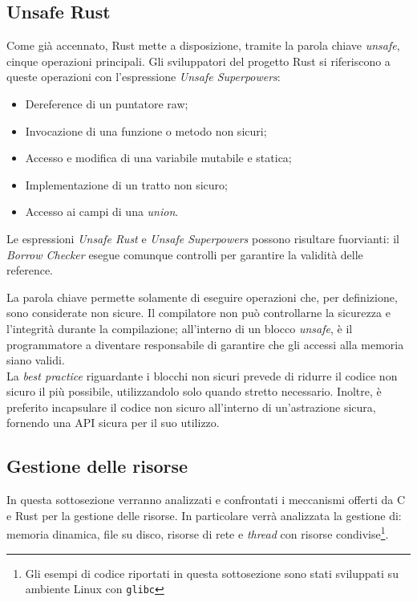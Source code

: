 \subsection*{Unsafe Rust}
Come già accennato, Rust mette a disposizione, tramite la parola chiave \textit{unsafe}, cinque operazioni principali. Gli sviluppatori
del progetto Rust si riferiscono a queste operazioni con l'espressione \textit{Unsafe Superpowers}:
\begin{itemize}
    \item Dereference di un puntatore raw;
    \item Invocazione di una funzione o metodo non sicuri;
    \item Accesso e modifica di una variabile mutabile e statica;
    \item Implementazione di un tratto non sicuro;
    \item Accesso ai campi di una \textit{union}.
\end{itemize}
Le espressioni \textit{Unsafe Rust} e \textit{Unsafe Superpowers} possono risultare fuorvianti: il \textit{Borrow Checker} esegue 
comunque controlli per garantire la validità delle reference. 

La parola chiave permette solamente di eseguire operazioni che, per definizione, sono considerate non sicure. 
Il compilatore non può controllarne la sicurezza e l'integrità durante la compilazione; all'interno di un blocco
 \textit{unsafe}, è il programmatore a diventare responsabile di garantire che gli accessi alla memoria
siano validi. \hfill
\vspace{12pt}\\
\noindent La \textit{best practice} riguardante i blocchi non sicuri prevede di ridurre il codice non sicuro il più possibile, utilizzandolo solo quando stretto necessario.
Inoltre, è preferito incapsulare il codice non sicuro all'interno di un'astrazione sicura, fornendo una API sicura per il suo utilizzo. \hfill

\subsection{Gestione delle risorse}
In questa sottosezione verranno analizzati e confrontati i meccanismi offerti da C e Rust per la gestione delle risorse. In particolare
verrà analizzata la gestione di: memoria dinamica, file su disco, risorse di rete e \textit{thread} con risorse condivise\footnote{Gli esempi di codice riportati in questa sottosezione sono stati sviluppati su ambiente Linux con \texttt{glibc}}.

